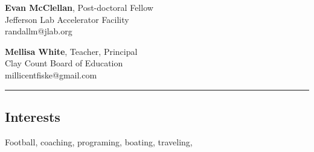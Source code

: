 \documentclass[12pt,letterpaper]{article}
\begin{document}
\begin{multicols}{2}
		{\bf{Evan McClellan}}, Post-doctoral Fellow\\
	Jefferson Lab Accelerator Facility\\
	randallm@jlab.org\\
	
	\columnbreak

	{\bf{Mellisa White}}, Teacher, Principal\\
	Clay Count Board of Education\\
	millicentfiske@gmail.com\\	

\end{multicols}


\hrule

\subsection*{Interests}

	Football, coaching, programing, boating, traveling,
\end{document}

